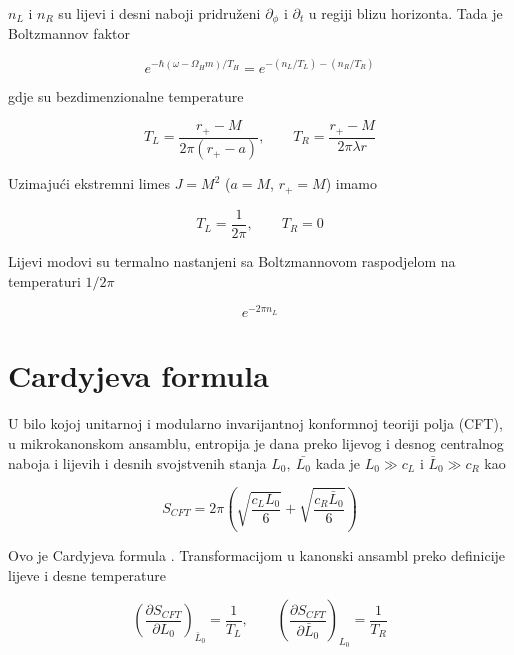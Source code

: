 \noindent $n_L$ i $n_R$ su lijevi i desni naboji pridruženi $\partial_\phi$ i $\partial_t$ u regiji blizu horizonta. Tada je Boltzmannov faktor

\begin{equation}
e^{-\hbar(\omega-\Omega_H m)/T_H}=e^{-(n_L/T_L)-(n_R/T_R)}
\end{equation}

\noindent gdje su bezdimenzionalne temperature

\begin{equation}
T_L=\frac{r_+-M}{2\pi(r_+-a)},\qquad T_R=\frac{r_+-M}{2\pi\lambda r}
\end{equation}

\noindent Uzimajući ekstremni limes $J=M^2$ ($a=M$, $r_+=M$) imamo

\begin{equation}
T_L=\frac{1}{2\pi},\qquad T_R=0
\end{equation}

\noindent Lijevi modovi su termalno nastanjeni sa Boltzmannovom raspodjelom na temperaturi $1/2\pi$

\begin{equation}
e^{-2\pi n_L}
\end{equation}

\section{Cardyjeva formula}\label{sec:Cardy}

U bilo kojoj unitarnoj i modularno invarijantnoj konformnoj teoriji polja (CFT), u mikrokanonskom ansamblu, entropija je dana preko lijevog i desnog centralnog naboja i lijevih i desnih svojstvenih stanja $L_0,\ \bar{L_0}$ kada je $L_0\gg c_L$ i $\bar{L}_0\gg c_R$ kao

\begin{equation}
S_{CFT}=2\pi\left(\sqrt{\frac{c_L L_0}{6}}+\sqrt{\frac{c_R \bar{L}_0}{6}}\right)
\label{eq:entr1}
\end{equation}

\noindent Ovo je Cardyjeva formula \citep{Cardy1, Cardy2}. Transformacijom u kanonski ansambl preko definicije lijeve i desne temperature

\begin{equation}
\left(\frac{\partial S_{CFT}}{\partial L_0}\right)_{\bar{L}_0}=\frac{1}{T_L},\qquad \left(\frac{\partial S_{CFT}}{\partial \bar{L}_0}\right)_{L_0}=\frac{1}{T_R}
\end{equation}

